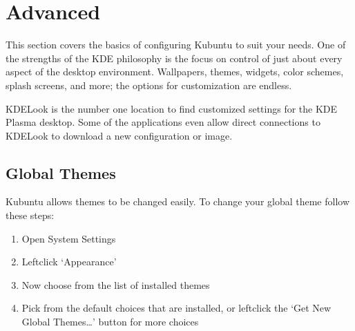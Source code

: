 \documentclass[letterpaper,10pt,english]{sphinxmanual}
\begin{document}
\sphinxAtStartPar
{\hyperref[\detokenize{docs/desktop-guide/basic:basic}]{}}


\section{Advanced}
\label{\detokenize{docs/desktop-guide/advanced:advanced}}\label{\detokenize{docs/desktop-guide/advanced:advanced-link}}\label{\detokenize{docs/desktop-guide/advanced::doc}}
\sphinxAtStartPar
This section covers the basics of configuring Kubuntu to suit your needs. One of the strengths of the KDE philosophy is the focus on control of just about every aspect of the desktop environment. Wallpapers, themes, widgets, color schemes, splash screens, and more; the options for customization are endless.

\sphinxAtStartPar
KDE\sphinxhyphen{}Look is the number one location to find customized settings for the KDE Plasma desktop. Some of the applications even allow direct connections to KDE\sphinxhyphen{}Look to download a new configuration or image.


\subsection{Global Themes}
\label{\detokenize{docs/desktop-guide/advanced:global-themes}}
\sphinxAtStartPar
Kubuntu allows themes to be changed easily. To change your global theme follow these steps:
\begin{enumerate}
%
\item {} 
\sphinxAtStartPar
Open System Settings

\item {} 
\sphinxAtStartPar
Left\sphinxhyphen{}click ‘Appearance’

\item {} 
\sphinxAtStartPar
Now choose from the list of installed themes

\item {} 
\sphinxAtStartPar
Pick from the default choices that are installed, or left\sphinxhyphen{}click the ‘Get New Global Themes…’ button for more choices

\end{enumerate}
\end{document}
